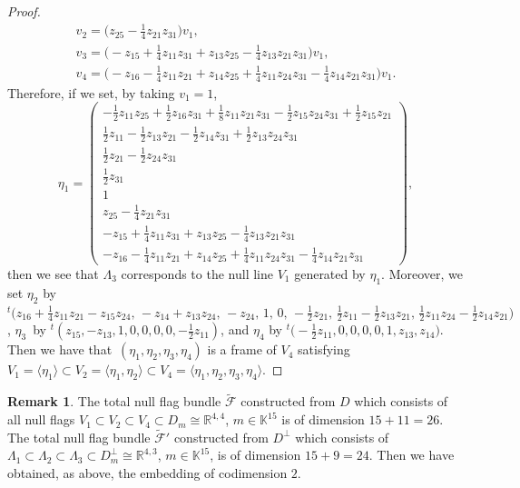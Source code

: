\documentclass[pdftex]{sigma}
\numberwithin{equation}{section}
\theoremstyle{definition}
\newtheorem{Rem}{Remark}[section]
\newcommand{\ber}{\begin{Rem}}
\newcommand{\enr}{
 \stepcounter{Th}\stepcounter{Cor}\stepcounter{Prop}
 \stepcounter{Lem}\stepcounter{Def}\stepcounter{Ex}\end{Rem}}
\newcommand{\R}{\mathbb{R}}
\newcommand{\KK}{\mathbb{K}}
\newcommand{\0}{\boldsymbol{0}}
\begin{document}
\begin{proof}
\begin{gather*}
v_2 = \biggl(z_{25} -\frac{1}{4}z_{21}z_{31}\biggr)v_1,
\\
v_3 = \biggl(- z_{15} + \frac{1}{4}z_{11}z_{31} + z_{13}z_{25} - \frac{1}{4}z_{13}z_{21}z_{31}\biggr)v_1,
\\
v_4 = \biggl(- z_{16} - \frac{1}{4}z_{11}z_{21} + z_{14}z_{25} + \frac{1}{4}z_{11}z_{24}z_{31}
- \frac{1}{4}z_{14}z_{21}z_{31}\biggr)v_1.
\end{gather*}
Therefore, if we set, by taking $v_1 = 1$,
\[
\eta_1 =
\begin{pmatrix}
- \frac{1}{2}z_{11}z_{25} + \frac{1}{2}z_{16}z_{31} + \frac{1}{8}z_{11}z_{21}z_{31}
- \frac{1}{2}z_{15}z_{24}z_{31} + \frac{1}{2}z_{15}z_{21}
\\
\frac{1}{2}z_{11} - \frac{1}{2}z_{13}z_{21} - \frac{1}{2}z_{14}z_{31} + \frac{1}{2}z_{13}z_{24}z_{31}
\\
\frac{1}{2}z_{21} - \frac{1}{2}z_{24}z_{31}
\\
\frac{1}{2}z_{31}
\\
1
\\
z_{25} -\frac{1}{4}z_{21}z_{31}
\\
- z_{15} + \frac{1}{4}z_{11}z_{31} + z_{13}z_{25} - \frac{1}{4}z_{13}z_{21}z_{31}
\\
- z_{16} - \frac{1}{4}z_{11}z_{21} + z_{14}z_{25} + \frac{1}{4}z_{11}z_{24}z_{31} - \frac{1}{4}z_{14}z_{21}z_{31}
\end{pmatrix},
\]
then we see that $\Lambda_3$ corresponds to the null line $V_1$ generated by $\eta_1$.
Moreover, we set $\eta_2$ by
$
{}^t\bigl(z_{16} + \frac{1}{4}z_{11}z_{21} - z_{15}z_{24}, \,- z_{14} + z_{13}z_{24}, \, - z_{24}, \,1, \,0, \,- \frac{1}{2}z_{21}, \,
\frac{1}{2}z_{11} - \frac{1}{2}z_{13}z_{21}, \,\frac{1}{2}z_{11}z_{24} - \frac{1}{2}z_{14}z_{21}\bigr)
$,
$\eta_3$~by ${}^t(z_{15}, - z_{13}, 1, 0, 0, 0, 0, - \frac{1}{2}z_{11})
$, and $\eta_4$ by
$
{}^t\bigl(-\frac{1}{2}z_{11}, 0, 0, 0, 0, 1, z_{13}, z_{14}\bigr)
$.
Then we have that~$(\eta_1, \eta_2, \eta_3, \eta_4)$ is a frame of $V_4$ satisfying
$V_1 = \langle \eta_1\rangle \subset V_2 = \langle \eta_1, \eta_2\rangle \subset V_4 = \langle \eta_1, \eta_2, \eta_3, \eta_4\rangle$.
\end{proof}

\ber
{\rm
The total null flag bundle $\widetilde{\mathcal F}$ constructed from $D$ which consists of all null flags $V_1 \subset V_2 \subset V_4 \subset D_m \cong \R^{4,4}$, $m \in \KK^{15}$
is of dimension $15 + 11 = 26$.
The total null flag bundle $\widetilde{\mathcal F}'$ constructed from $D^\perp$ which consists of $\Lambda_1 \subset
\Lambda_2 \subset \Lambda_3 \subset D^\perp_m \cong \R^{4,3}$, $m \in \KK^{15}$, is of dimension $15+9 = 24$.
Then we have obtained, as above, the embedding  of codimension $2$.
}
\enr
\end{document}
